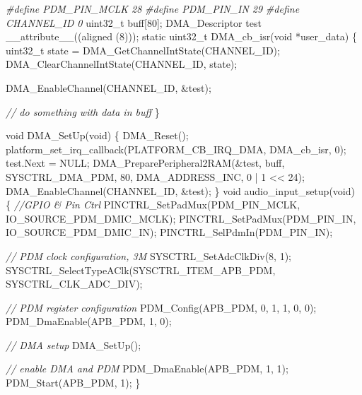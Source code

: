 \documentclass[
  12pt,
]{book}
\newenvironment{Shaded}{\begin{snugshade}}{\end{snugshade}}
\newcommand{\CommentTok}[1]{\textcolor[rgb]{0.56,0.35,0.01}{\textit{#1}}}
\newcommand{\DataTypeTok}[1]{\textcolor[rgb]{0.13,0.29,0.53}{#1}}
\newcommand{\DecValTok}[1]{\textcolor[rgb]{0.00,0.00,0.81}{#1}}
\newcommand{\NormalTok}[1]{#1}
\newcommand{\PreprocessorTok}[1]{\textcolor[rgb]{0.56,0.35,0.01}{\textit{#1}}}
\begin{document}
\begin{Shaded}
\begin{Highlighting}[]
\PreprocessorTok{#define PDM_PIN_MCLK        28}
\PreprocessorTok{#define PDM_PIN_IN          29}
\PreprocessorTok{#define CHANNEL_ID  0}
\DataTypeTok{uint32_t}\NormalTok{ buff[}\DecValTok{80}\NormalTok{];}
\NormalTok{DMA_Descriptor test __attribute__((aligned (}\DecValTok{8}\NormalTok{)));}
\DataTypeTok{static} \DataTypeTok{uint32_t}\NormalTok{ DMA_cb_isr(}\DataTypeTok{void}\NormalTok{ *user_data)}
\NormalTok{\{ }
    \DataTypeTok{uint32_t}\NormalTok{ state = DMA_GetChannelIntState(CHANNEL_ID);}
\NormalTok{    DMA_ClearChannelIntState(CHANNEL_ID, state);}

\NormalTok{    DMA_EnableChannel(CHANNEL_ID, &test);}

    \CommentTok{// do something with data in buff}
\NormalTok{\}}

\DataTypeTok{void}\NormalTok{ DMA_SetUp(}\DataTypeTok{void}\NormalTok{)}
\NormalTok{\{}
\NormalTok{    DMA_Reset();}
\NormalTok{    platform_set_irq_callback(PLATFORM_CB_IRQ_DMA, DMA_cb_isr, }\DecValTok{0}\NormalTok{);  }
\NormalTok{    test.Next = NULL;}
\NormalTok{    DMA_PreparePeripheral2RAM(&test, }
\NormalTok{                              buff, }
\NormalTok{                              SYSCTRL_DMA_PDM, }
                              \DecValTok{80}\NormalTok{, }
\NormalTok{                              DMA_ADDRESS_INC, }
                              \DecValTok{0}\NormalTok{ | }\DecValTok{1}\NormalTok{ << }\DecValTok{24}\NormalTok{);}
\NormalTok{    DMA_EnableChannel(CHANNEL_ID, &test);}
\NormalTok{\}}
\DataTypeTok{void}\NormalTok{ audio_input_setup(}\DataTypeTok{void}\NormalTok{)}
\NormalTok{\{}
    \CommentTok{//GPIO & Pin Ctrl}
\NormalTok{    PINCTRL_SetPadMux(PDM_PIN_MCLK, IO_SOURCE_PDM_DMIC_MCLK);}
\NormalTok{    PINCTRL_SetPadMux(PDM_PIN_IN, IO_SOURCE_PDM_DMIC_IN);}
\NormalTok{    PINCTRL_SelPdmIn(PDM_PIN_IN);}

    \CommentTok{// PDM clock configuration, 3M}
\NormalTok{    SYSCTRL_SetAdcClkDiv(}\DecValTok{8}\NormalTok{, }\DecValTok{1}\NormalTok{);}
\NormalTok{    SYSCTRL_SelectTypeAClk(SYSCTRL_ITEM_APB_PDM, SYSCTRL_CLK_ADC_DIV);}
    
    \CommentTok{// PDM register configuration}
\NormalTok{    PDM_Config(APB_PDM, }\DecValTok{0}\NormalTok{, }\DecValTok{1}\NormalTok{, }\DecValTok{1}\NormalTok{, }\DecValTok{0}\NormalTok{, }\DecValTok{0}\NormalTok{);    }
\NormalTok{    PDM_DmaEnable(APB_PDM, }\DecValTok{1}\NormalTok{, }\DecValTok{0}\NormalTok{);}
    
    \CommentTok{// DMA setup}
\NormalTok{    DMA_SetUp();}
    
    \CommentTok{// enable DMA and PDM}
\NormalTok{    PDM_DmaEnable(APB_PDM, }\DecValTok{1}\NormalTok{, }\DecValTok{1}\NormalTok{);}
\NormalTok{    PDM_Start(APB_PDM, }\DecValTok{1}\NormalTok{);}
\NormalTok{\}}
\end{Highlighting}
\end{Shaded}
\end{document}
